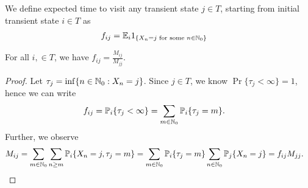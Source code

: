 \documentclass[a4paper,10pt,english]{article}
\begin{document}
\begin{defn} We define expected time to visit any transient state $j \in T$, starting from initial transient state $i \in T$ as 
\begin{align*}
f_{ij} &= \mathbb{E}_i1_{\{X_n = j \text{ for some } n \in \mathbb{N}_0 \}}
\end{align*}
\end{defn}
\begin{lem} For all $i, \in T$, we have $f_{ij} = \frac{M_{ij}}{M_{jj}}$.
\end{lem}
\begin{proof} 
Let $\tau_j = \inf\{ n \in \mathbb{N}_0 : X_n = j \}$. 
Since $j \in T$, we know $\Pr\{\tau_j < \infty \} = 1$, hence we can write 
\begin{align*}
f_{ij} &= \mathbb{P}_i\{\tau_j < \infty\} = \sum_{m \in \mathbb{N}_0}\mathbb{P}_i\{\tau_j = m\}.
\end{align*}
Further, we observe
\begin{align*}
M_{ij} &= \sum_{m \in \mathbb{N}_0}\sum_{n \geq m}\mathbb{P}_i\{X_n = j, \tau_j = m\} = \sum_{m \in \mathbb{N}_0}\mathbb{P}_i\{\tau_j = m\}\sum_{n \in \mathbb{N}_0}\mathbb{P}_j\{X_n = j\} = f_{ij}M_{jj}.
\end{align*}
\end{proof}
 
\end{document}

